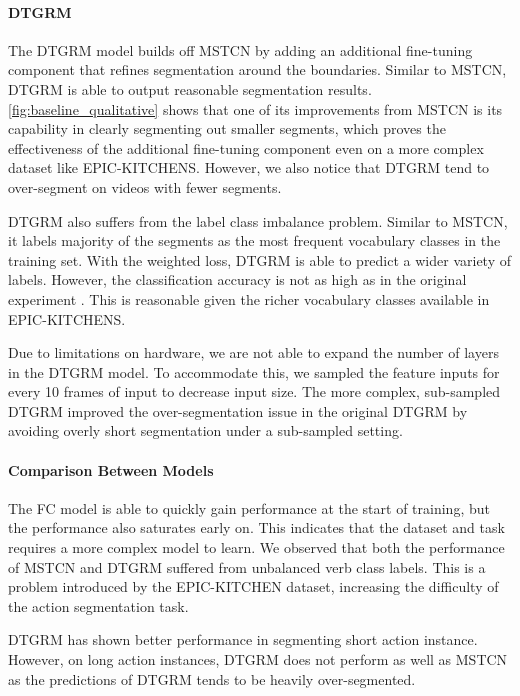 \paragraph{DTGRM} The DTGRM model builds off MSTCN by adding an additional fine-tuning component that refines segmentation around the boundaries. Similar to MSTCN, DTGRM is able to output reasonable segmentation results. \ref{fig:baseline_qualitative} shows that one of its improvements from MSTCN is its capability in clearly segmenting out smaller segments, which proves the effectiveness of the additional fine-tuning component even on a more complex dataset like EPIC-KITCHENS. However, we also notice that DTGRM tend to over-segment on videos with fewer segments.

DTGRM also suffers from the label class imbalance problem. Similar to MSTCN, it labels majority of the segments as the most frequent vocabulary classes in the training set. With the weighted loss, DTGRM is able to predict a wider variety of labels. However, the classification accuracy is not as high as in the original experiment \cite{wang2020temporal}. This is reasonable given the richer vocabulary classes available in EPIC-KITCHENS.

Due to limitations on hardware, we are not able to expand the number of layers in the DTGRM model. To accommodate this, we sampled the feature inputs for every 10 frames of input to decrease input size. The more complex, sub-sampled DTGRM improved the over-segmentation issue in the original DTGRM by avoiding overly short segmentation under a sub-sampled setting.

\paragraph{Comparison Between Models}
The FC model is able to quickly gain performance at the start of training, but the performance also saturates early on. This indicates that the dataset and task requires a more complex model to learn. We observed that both the performance of MSTCN and DTGRM suffered from unbalanced verb class labels. This is a problem introduced by the EPIC-KITCHEN dataset, increasing the difficulty of the action segmentation task. 

DTGRM has shown better performance in segmenting short action instance. However, on long action instances, DTGRM does not perform as well as MSTCN as the predictions of DTGRM tends to be heavily over-segmented.

